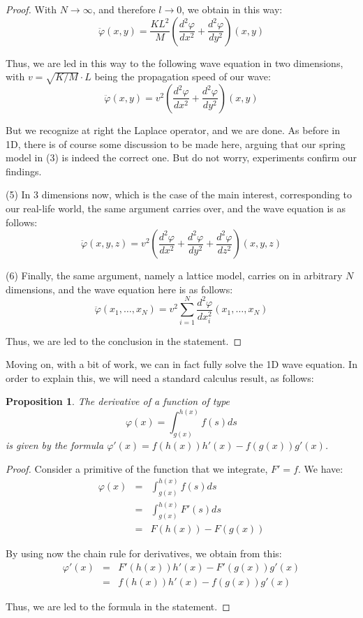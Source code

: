 \documentclass[12pt]{amsbook}
\newtheorem{proposition}[theorem]{Proposition}
\begin{document}
\begin{proof}
With $N\to\infty$, and therefore $l\to0$, we obtain in this way:
$$\ddot{\varphi}(x,y)=\frac{KL^2}{M}\left(\frac{d^2\varphi}{dx^2}+\frac{d^2\varphi}{dy^2}\right)(x,y)$$

Thus, we are led in this way to the following wave equation in two dimensions, with $v=\sqrt{K/M}\cdot L$ being the propagation speed of our wave:
$$\ddot{\varphi}(x,y)=v^2\left(\frac{d^2\varphi}{dx^2}+\frac{d^2\varphi}{dy^2}\right)(x,y)$$

But we recognize at right the Laplace operator, and we are done. As before in 1D, there is of course some discussion to be made here, arguing that our spring model in (3) is indeed the correct one. But do not worry, experiments confirm our findings.

\medskip

(5) In 3 dimensions now, which is the case of the main interest, corresponding to our real-life world, the same argument carries over, and the wave equation is as follows:
$$\ddot{\varphi}(x,y,z)=v^2\left(\frac{d^2\varphi}{dx^2}+\frac{d^2\varphi}{dy^2}+\frac{d^2\varphi}{dz^2}\right)(x,y,z)$$

(6) Finally, the same argument, namely a lattice model, carries on in arbitrary $N$ dimensions, and the wave equation here is as follows:
$$\ddot{\varphi}(x_1,\ldots,x_N)=v^2\sum_{i=1}^N\frac{d^2\varphi}{dx_i^2}(x_1,\ldots,x_N)$$

Thus, we are led to the conclusion in the statement.
\end{proof}

Moving on, with a bit of work, we can in fact fully solve the 1D wave equation. In order to explain this, we will need a standard calculus result, as follows:

\begin{proposition}
The derivative of a function of type
$$\varphi(x)=\int_{g(x)}^{h(x)}f(s)ds$$
is given by the formula $\varphi'(x)=f(h(x))h'(x)-f(g(x))g'(x)$.
\end{proposition}

\begin{proof}
Consider a primitive of the function that we integrate, $F'=f$. We have:
\begin{eqnarray*}
\varphi(x)
&=&\int_{g(x)}^{h(x)}f(s)ds\\
&=&\int_{g(x)}^{h(x)}F'(s)ds\\
&=&F(h(x))-F(g(x))
\end{eqnarray*}

By using now the chain rule for derivatives, we obtain from this:
\begin{eqnarray*}
\varphi'(x)
&=&F'(h(x))h'(x)-F'(g(x))g'(x)\\
&=&f(h(x))h'(x)-f(g(x))g'(x)
\end{eqnarray*}

Thus, we are led to the formula in the statement.
\end{proof}
\end{document}
